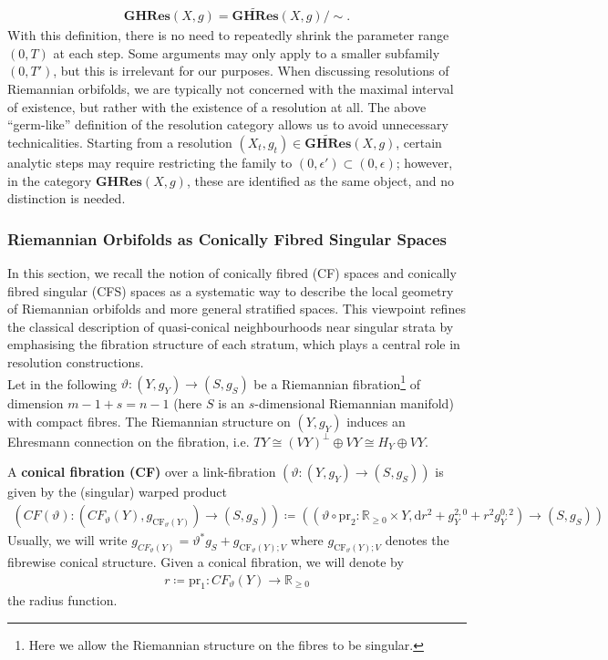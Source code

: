\documentclass[psamsfonts]{amsart}
\theoremstyle{plain}
\theoremstyle{definition}{
\newtheorem{defi}{Definition}[section]
\newtheorem{ass}{Assumption}
\newtheorem*{nota}{Notation}}
\theoremstyle{remark}{
\newtheorem{rem}{Remark}
\newtheorem{ex}{Example}}
\theoremstyle{plain}{
\newtheorem{thm}{Theorem}[section]
\newtheorem{lem}{Lemma}[section]
\newtheorem{cor}{Corollary}[section]
\newtheorem{prop}{Proposition}[section]
\newtheorem{con}{Conjecture}[section]}
\newcommand{\m}[1]{{\mathrm{#1}}}
\newcommand{\cat}[1]{\textbf{#1}}
\begin{document}
\begin{align*}
    \cat{GHRes}(X,g)=\widetilde{\cat{GHRes}}(X,g)/\sim.
\end{align*}
With this definition, there is no need to repeatedly shrink the parameter range $(0, T)$ at each step. Some arguments may only apply to a smaller subfamily $(0, T')$, but this is irrelevant for our purposes. When discussing resolutions of Riemannian orbifolds, we are typically not concerned with the maximal interval of existence, but rather with the existence of a resolution at all. The above “germ-like” definition of the resolution category allows us to avoid unnecessary technicalities. Starting from a resolution $(X_t, g_t) \in \widetilde{\cat{GHRes}}(X, g)$, certain analytic steps may require restricting the family to $(0, \epsilon') \subset (0, \epsilon)$; however, in the category $\cat{GHRes}(X, g)$, these are identified as the same object, and no distinction is needed.

\subsubsection{Riemannian Orbifolds as Conically Fibred Singular Spaces}
\label{Riemannian Orbifolds as Conically Fibred Singular Spaces}

In this section, we recall the notion of conically fibred (CF) spaces and conically fibred singular (CFS) spaces as a systematic way to describe the local geometry of Riemannian orbifolds and more general stratified spaces. This viewpoint refines the classical description of quasi-conical neighbourhoods near singular strata by emphasising the fibration structure of each stratum, which plays a central role in resolution constructions.\\

Let in the following $\vartheta\colon (Y,g_{Y})\rightarrow (S,g_S)$ be a Riemannian fibration\footnote{Here we allow the Riemannian structure on the fibres to be singular.} of dimension $m-1+s=n-1$ (here $S$ is an $s$-dimensional Riemannian manifold) with compact fibres. The Riemannian structure on $(Y,g_Y)$ induces an Ehresmann connection on the fibration, i.e. $TY\cong (VY)^\perp \oplus VY\cong H_Y\oplus VY$.

\begin{defi}
A \textbf{conical fibration (CF)} over a link-fibration $(\vartheta\colon (Y,g_{Y})\rightarrow (S,g_S))$ is given by the (singular) warped product
\begin{align*}
    \left(CF(\vartheta)\colon (CF_\vartheta(Y),g_{\m{CF}_\vartheta(Y)})\rightarrow (S,g_S)\right)\coloneqq\left((\vartheta\circ\m{pr}_2\colon \mathbb{R}_{\geq 0}\times Y,\m{d}r^2+g^{2,0}_{Y}+r^2g^{0,2}_{Y})\rightarrow (S,g_S)\right)
\end{align*}
Usually, we will write $g_{CF_\vartheta(Y)}=\vartheta^*g_{S}+g_{\m{CF}_\vartheta(Y);V}$ where $g_{\m{CF}_\vartheta(Y);V}$ denotes the fibrewise conical structure. Given a conical fibration, we will denote by 
\begin{align*}
    r\coloneqq \m{pr}_1\colon CF_\vartheta(Y)\rightarrow \mathbb{R}_{\geq 0}
\end{align*}
the radius function.
\end{defi}
\end{document}
